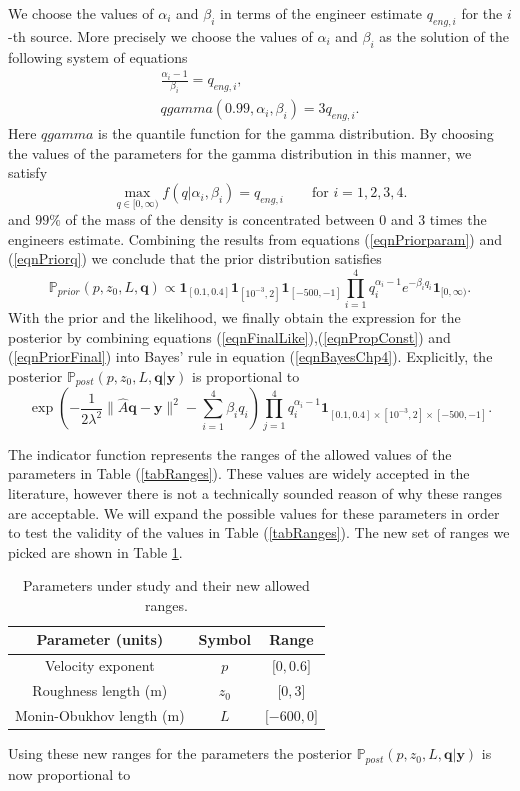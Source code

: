 \documentclass[12pt]{book}
\newcommand{\post}{\mathbb{P}_{post}}
\newcommand{\prior}{\mathbb{P}_{prior}}
\newcommand{\q}{\textbf{q}}
\newcommand{\pars}{p,z_{0},L}
\newcommand{\y}{\textbf{y}}
\begin{document}
We choose the values of $\alpha_{i}$ and $\beta_{i}$  in terms of
the engineer estimate $q_{eng,i}$ for the $i$-th source.
More precisely we choose the values of $\alpha_{i}$ and $\beta_{i}$ 
as the solution of the 
following system of equations
\begin{eqnarray*}
\frac{\alpha_{i}-1}{\beta_{i}}=q_{eng,i}, \\
qgamma(0.99,\alpha_{i},\beta_{i})=3q_{eng,i}.
\end{eqnarray*}
Here $qgamma$ is the quantile function for the gamma distribution. By choosing the values
of the parameters for the gamma distribution in this manner, we satisfy
\begin{equation*}
\max_{q\in [0,\infty)}f(q|\alpha_{i},\beta_{i})=q_{eng,i}\qquad\text{for }i=1,2,3,4.
\end{equation*}
and $99\%$ of the mass of the density is concentrated between 0 and 3 times the
engineers estimate. 
Combining the results from equations (\ref{eqnPriorparam}) and (\ref{eqnPriorq})
we conclude that the prior distribution  satisfies
\begin{equation}\label{eqnPriorFinal}
\prior(p,z_{0},L,\q)\propto \textbf{1}_{[0.1,0.4]}\textbf{1}_{[10^{-3},2]}\textbf{1}_{[-500,-1]}\prod_{i=1}^{4}q_{i}^{\alpha_{i}-1}e^{-\beta_{i} q_{i}}\textbf{1}_{[0,\infty)}.
\end{equation}
With the prior and the likelihood, we finally obtain the expression for the posterior by combining equations (\ref{eqnFinalLike}),(\ref{eqnPropConst}) and (\ref{eqnPriorFinal})
into Bayes' rule in equation (\ref{eqnBayesChp4}). Explicitly,  the posterior $\post(\pars,\q|\y)$ is proportional to
\begin{equation*}
\exp\left(-\frac{1}{2\lambda^{2}}\|\widehat{A}\q-\y\|^{2}-\sum_{i=1}^{4}\beta_{i}q_{i}\right)\prod_{j=1}^{4}q_{i}^{\alpha_{i}-1}\textbf{1}_{[0.1,0.4]\times[10^{-3},2]\times[-500,-1]}.
\end{equation*}


The indicator function represents the ranges of the allowed  values of the parameters in Table (\ref{tabRanges}). 
These values are widely accepted in the literature, however there is not
a technically sounded reason of why these ranges are acceptable.  We will expand the possible values for  these parameters
in order to test the validity of the values in Table (\ref{tabRanges}). The new set of ranges we picked are shown
in Table \ref{tabNewRanges}.


\begin{table}[H]
\centering
\begin{tabular}{|c|c|c|}
\hline 
Parameter (units) & Symbol & Range\tabularnewline
\hline 
\hline 
Velocity exponent  & $p$ & ${[}0,0.6{]}$\tabularnewline
\hline 
Roughness length (m) & $z_{0}$ & ${[}0 ,3{]}$\tabularnewline
\hline 
Monin-Obukhov length (m) & $L$ & ${[}-600,0{]}$\tabularnewline
\hline 
\end{tabular}
\caption{Parameters under study and their new allowed ranges.}
\label{tabNewRanges}
\end{table}
Using these new ranges for the parameters the posterior $\post(\pars,\q|\y)$ is now proportional to
\end{document}
